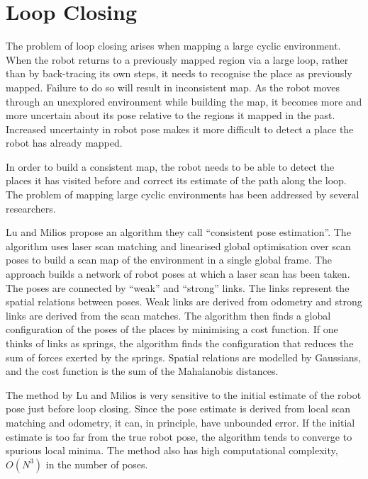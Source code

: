 \section{Loop Closing}
\label{sec:back_loop}

The problem of loop closing arises when mapping a large cyclic
environment. When the robot returns to a previously mapped region via
a large loop, rather than by back-tracing its own steps, it needs to
recognise the place as previously mapped. Failure to do so will result
in inconsistent map.  As the robot moves through an unexplored
environment while building the map, it becomes more and more uncertain
about its pose relative to the regions it mapped in the past.
Increased uncertainty in robot pose makes it more difficult to
detect a place the robot has already mapped.


In order to build a consistent map, the robot needs to be able to
detect the places it has visited before and correct its estimate of
the path along the loop. The problem of mapping large cyclic
environments has been addressed by several researchers.




Lu and Milios \cite{lu97:_global} propose an algorithm they call
``consistent pose estimation''. The algorithm uses laser scan matching
and linearised global optimisation over scan poses to build a scan map
of the environment in a single global frame. The approach builds a
network of robot poses at which a laser scan has been taken. The poses
are connected by ``weak'' and ``strong'' links. The links represent
the spatial relations between poses. Weak links are derived from
odometry and strong links are derived from the scan matches. The
algorithm then finds a global configuration of the poses of the places
by minimising a cost function. If one thinks of links as springs, the
algorithm finds the configuration that reduces the sum of forces
exerted by the springs. Spatial relations are modelled by Gaussians,
and the cost function is the sum of the Mahalanobis distances.

The method by Lu and Milios is very sensitive to the initial estimate
of the robot pose just before loop closing. Since the pose estimate is
derived from local scan matching and odometry, it can, in principle,
have unbounded error. If the initial estimate is too far from the true
robot pose, the algorithm tends to converge to spurious local minima.
The method also has high computational complexity, $O(N^3)$ in the number of poses.


